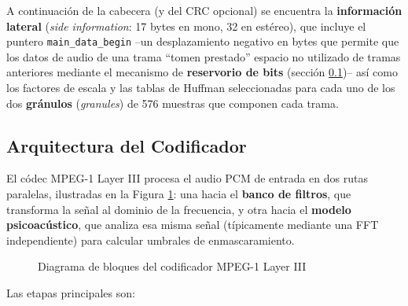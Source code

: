 \documentclass[pdflatex,sn-mathphys-num]{sn-jnl}%
\begin{document}
A continuación de la cabecera (y del CRC opcional) se encuentra la \textbf{información lateral} (\textit{side information}: 17 bytes en mono, 32 en estéreo), que incluye el puntero \texttt{main\_data\_begin} --un desplazamiento negativo en bytes que permite que los datos de audio de una trama ``tomen prestado'' espacio no utilizado de tramas anteriores mediante el mecanismo de \textbf{reservorio de bits} (sección \ref{sec:encoder})-- así como los factores de escala y las tablas de Huffman seleccionadas para cada uno de los dos \textbf{gránulos} (\textit{granules}) de 576 muestras que componen cada trama.

\subsection{Arquitectura del Codificador}\label{sec:encoder}
El códec MPEG-1 Layer III procesa el audio PCM de entrada en dos rutas paralelas, ilustradas en la Figura \ref{fig:encoder_block}: una hacia el \textbf{banco de filtros}, que transforma la señal al dominio de la frecuencia, y otra hacia el \textbf{modelo psicoacústico}, que analiza esa misma señal (típicamente mediante una FFT independiente) para calcular umbrales de enmascaramiento.

\begin{figure}[!h]
    \centering
    \caption{Diagrama de bloques del codificador MPEG-1 Layer III}
    \label{fig:encoder_block}
\end{figure}

Las etapas principales son:
\end{document}

